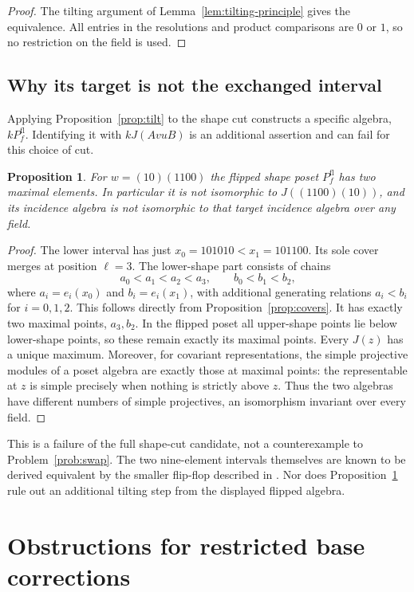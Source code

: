 \documentclass[11pt]{article}
\newtheorem{proposition}[theorem]{Proposition}
\theoremstyle{definition}
\begin{document}
\begin{proof}
The tilting argument of Lemma~\ref{lem:tilting-principle} gives
the equivalence. All entries in
the resolutions and product comparisons are $0$ or $1$, so no
restriction on the field is used.
\end{proof}


\subsection{Why its target is not the exchanged interval}
Applying Proposition~\ref{prop:tilt} to the shape cut constructs a
specific algebra, $kP_f^{\mathrm{fl}}$. Identifying it with
$kJ(AvuB)$ is an additional assertion and can fail for this choice
of cut.

\begin{proposition}\label{prop:wrong-target}
For $w=(10)(1100)$ the flipped shape poset $P_f^{\mathrm{fl}}$ has
two maximal elements. In particular it is not isomorphic to
$J((1100)(10))$, and its incidence algebra is not isomorphic to
that target incidence algebra over any field.
\end{proposition}
\begin{proof}
The lower interval has just $x_0=101010<x_1=101100$. Its sole cover
merges at position $\ell=3$. The lower-shape part consists of chains
\[
 a_0<a_1<a_2<a_3,\qquad b_0<b_1<b_2,
\]
where $a_i=e_i(x_0)$ and $b_i=e_i(x_1)$, with additional generating
relations $a_i<b_i$ for $i=0,1,2$. This follows directly from
Proposition~\ref{prop:covers}. It has exactly two maximal points,
$a_3,b_2$. In the flipped poset all upper-shape points lie below
lower-shape points, so these remain exactly its maximal points.
Every $J(z)$ has a unique maximum. Moreover, for covariant
representations, the simple projective modules of a poset algebra
are exactly those at maximal points: the representable at $z$ is
simple precisely when nothing is strictly above $z$. Thus the two
algebras have different numbers of simple projectives, an
isomorphism invariant over every field.
\end{proof}
This is a failure of the full shape-cut candidate, not a
counterexample to Problem~\ref{prob:swap}. The two nine-element
intervals themselves are known to be derived equivalent by the
smaller flip-flop described in \cite[Section 9]{Chapoton}.
Nor does Proposition~\ref{prop:wrong-target} rule out an additional
tilting step from the displayed flipped algebra.



\section{Obstructions for restricted base corrections}
\label{app:restricted}
\end{document}
